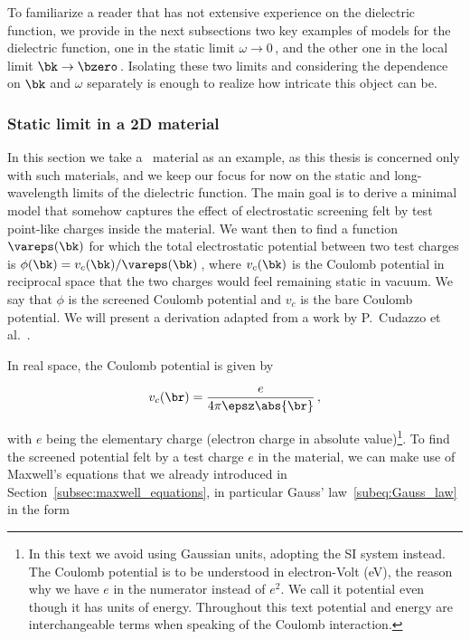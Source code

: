 To familiarize a reader that has not extensive experience on the dielectric function, we provide in the next subsections two key examples of models for the dielectric function, one in the static limit $\omega \to 0$\,, and the other one in the local limit $\bk \to \bzero$\,.
Isolating these two limits and considering the dependence on $\bk$ and $\omega$ separately is enough to realize how intricate this object can be.

\subsubsection{Static limit in a 2D material}
\label{subsubsec:dielectric_function_static_limit}

In this section we take a \bd~material as an example, as this thesis is concerned only with such materials, and we keep our focus for now on the static and long-wavelength limits of the dielectric function.
The main goal is to derive a minimal model that somehow captures the effect of electrostatic screening felt by test point-like charges inside the material.
We want then to find a function $\vareps(\bk)$ for which the total electrostatic potential between two test charges is $\phi(\bk) = v_c(\bk)/\vareps(\bk)$\,, where $v_c(\bk)$ is the Coulomb potential in reciprocal space that the two charges would feel remaining static in vacuum.
We say that $\phi$ is the screened Coulomb potential and $v_c$ is the bare Coulomb potential.
We will present a derivation adapted from a work by P.~Cudazzo et al.~\cite{Cudazzo_2011}.

In real space, the Coulomb potential is given by

\begin{equation}
\label{eq:Coulomb_potential_real_space}
    v_c(\br) = \frac{e}{4 \pi \epsz \abs{\br}}\,,
\end{equation}


\noindent with $e$ being the elementary charge (electron charge in absolute value)\footnote{In this text we avoid using Gaussian units, adopting the SI system instead. The Coulomb potential is to be understood in electron-Volt (eV), the reason why we have $e$ in the numerator instead of $e^2$. We call it potential even though it has units of energy. Throughout this text potential and energy are interchangeable terms when speaking of the Coulomb interaction.}.
To find the screened potential felt by a test charge $e$ in the material, we can make use of Maxwell's equations that we already introduced in Section~\ref{subsec:maxwell_equations}, in particular Gauss' law~\eqref{subeq:Gauss_law} in the form

